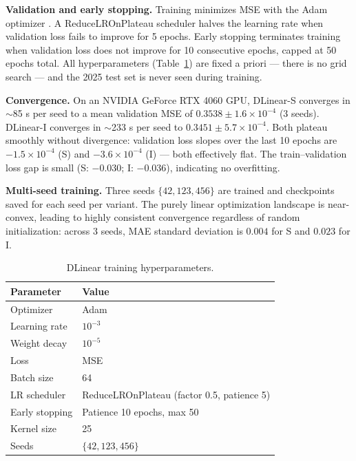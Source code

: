 \documentclass[12pt,a4paper,oneside]{report}
\begin{document}
\textbf{Validation and early stopping.} Training minimizes MSE with the Adam
optimizer \citep{kingma2015adam}. A ReduceLROnPlateau scheduler halves the
learning rate when validation loss fails to improve for 5 epochs. Early stopping
terminates training when validation loss does not improve for 10 consecutive
epochs, capped at 50 epochs total. All hyperparameters
(Table~\ref{tab:dlinear-hparams}) are fixed a priori --- there is no grid search
--- and the 2025 test set is never seen during training.

\textbf{Convergence.} On an NVIDIA GeForce RTX 4060 GPU, DLinear-S converges in
$\sim$85 s per seed to a mean validation MSE of $0.3538 \pm 1.6\!\times\!10^{-4}$
(3 seeds). DLinear-I converges in $\sim$233 s per seed to
$0.3451 \pm 5.7\!\times\!10^{-4}$. Both plateau smoothly without divergence:
validation loss slopes over the last 10 epochs are $-1.5 \times 10^{-4}$ (S) and
$-3.6 \times 10^{-4}$ (I) --- both effectively flat. The train--validation loss
gap is small (S: $-0.030$; I: $-0.036$), indicating no overfitting.

\textbf{Multi-seed training.} Three seeds
$\{42, 123, 456\}$ are trained and checkpoints saved for each seed per variant.
The purely linear optimization landscape is near-convex, leading to highly
consistent convergence regardless of random initialization: across 3 seeds, MAE
standard deviation is $0.004$ for S and $0.023$ for I.

\begin{table}[H]
\centering
\caption{DLinear training hyperparameters.}
\label{tab:dlinear-hparams}
\begin{tabular}{ll}
\toprule
\textbf{Parameter} & \textbf{Value} \\
\midrule
Optimizer      & Adam \\
Learning rate  & $10^{-3}$ \\
Weight decay   & $10^{-5}$ \\
Loss           & MSE \\
Batch size     & 64 \\
LR scheduler   & ReduceLROnPlateau (factor 0.5, patience 5) \\
Early stopping & Patience 10 epochs, max 50 \\
Kernel size    & 25 \\
Seeds          & $\{42, 123, 456\}$ \\
\bottomrule
\end{tabular}
\end{table}
\end{document}

